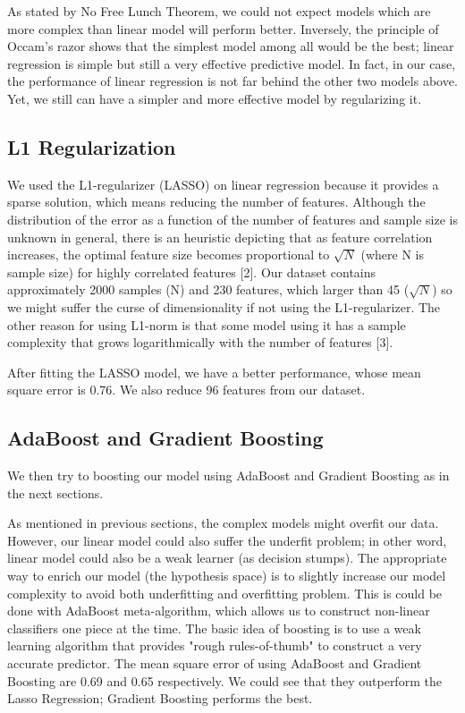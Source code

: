 \documentclass[paper=a4, fontsize=11pt, DIV=13]{scrartcl}
\begin{document}
As stated by No Free Lunch Theorem, we could not expect models which are more complex than linear model will perform better. Inversely, the principle of Occam’s razor shows that the simplest model among all would be the best; linear regression is simple but still a very effective predictive model. In fact, in our case, the performance of linear regression is not far behind the other two models above. Yet, we still can have a simpler and more effective model by regularizing it.

\subsection{L1 Regularization}
We used the L1-regularizer (LASSO) on linear regression because it provides a sparse solution, which means reducing the number of features. Although the distribution of the error as a function of the number of features and sample size is unknown in general, there is an heuristic depicting that as feature correlation increases, the optimal feature size becomes proportional to $\sqrt{N}$ (where N is sample size) for highly correlated features [2]. Our dataset contains approximately 2000 samples (N) and 230 features, which larger than 45 ($\sqrt{N}$) so we might suffer the curse of dimensionality if not using the L1-regularizer. The other reason for using L1-norm is that some model using it has a sample complexity that grows logarithmically with the number of features [3].

After fitting the LASSO model, we have a better performance, whose mean square error is 0.76. We also reduce 96 features from our dataset.

\subsection{AdaBoost and Gradient Boosting}

We then try to boosting our model using AdaBoost and Gradient Boosting as in the next sections.

As mentioned in previous sections, the complex models might overfit our data. However, our linear model could also suffer the underfit problem; in other word, linear model could also be a weak learner (as decision stumps). The appropriate way to enrich our model (the hypothesis space) is to slightly increase our model complexity to avoid both underfitting and overfitting problem. This is could be done with AdaBoost meta-algorithm, which allows us to construct non-linear classifiers one piece at the time. The basic idea of boosting is to use a weak learning algorithm that provides "rough rules-of-thumb" to construct a very accurate predictor. The mean square error of using AdaBoost and Gradient Boosting are 0.69 and 0.65 respectively. We could see that they outperform the Lasso Regression; Gradient Boosting performs the best.
\end{document}

